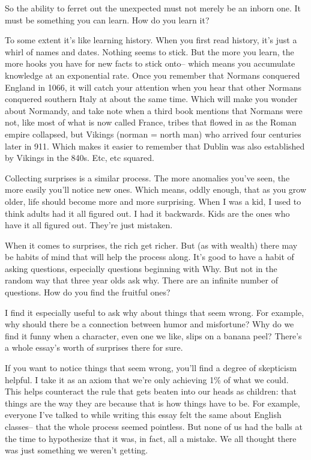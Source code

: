 \documentclass[12pt]{book}
\begin{document}
So the ability to ferret out the unexpected must not merely be an inborn
one. It must be something you can learn. How do you learn it?

To some extent it's like learning history. When you first read history,
it's just a whirl of names and dates. Nothing seems to stick. But the
more you learn, the more hooks you have for new facts to stick onto--
which means you accumulate knowledge at an exponential rate. Once you
remember that Normans conquered England in 1066, it will catch your
attention when you hear that other Normans conquered southern Italy at
about the same time. Which will make you wonder about Normandy, and take
note when a third book mentions that Normans were not, like most of what
is now called France, tribes that flowed in as the Roman empire
collapsed, but Vikings (norman = north man) who arrived four centuries
later in 911. Which makes it easier to remember that Dublin was also
established by Vikings in the 840s. Etc, etc squared.

Collecting surprises is a similar process. The more anomalies you've
seen, the more easily you'll notice new ones. Which means, oddly enough,
that as you grow older, life should become more and more surprising.
When I was a kid, I used to think adults had it all figured out. I had
it backwards. Kids are the ones who have it all figured out. They're
just mistaken.

When it comes to surprises, the rich get richer. But (as with wealth)
there may be habits of mind that will help the process along. It's good
to have a habit of asking questions, especially questions beginning with
Why. But not in the random way that three year olds ask why. There are
an infinite number of questions. How do you find the fruitful ones?

I find it especially useful to ask why about things that seem wrong. For
example, why should there be a connection between humor and misfortune?
Why do we find it funny when a character, even one we like, slips on a
banana peel? There's a whole essay's worth of surprises there for sure.

If you want to notice things that seem wrong, you'll find a degree of
skepticism helpful. I take it as an axiom that we're only achieving 1\%
of what we could. This helps counteract the rule that gets beaten into
our heads as children: that things are the way they are because that is
how things have to be. For example, everyone I've talked to while
writing this essay felt the same about English classes-- that the whole
process seemed pointless. But none of us had the balls at the time to
hypothesize that it was, in fact, all a mistake. We all thought there
was just something we weren't getting.
\end{document}
